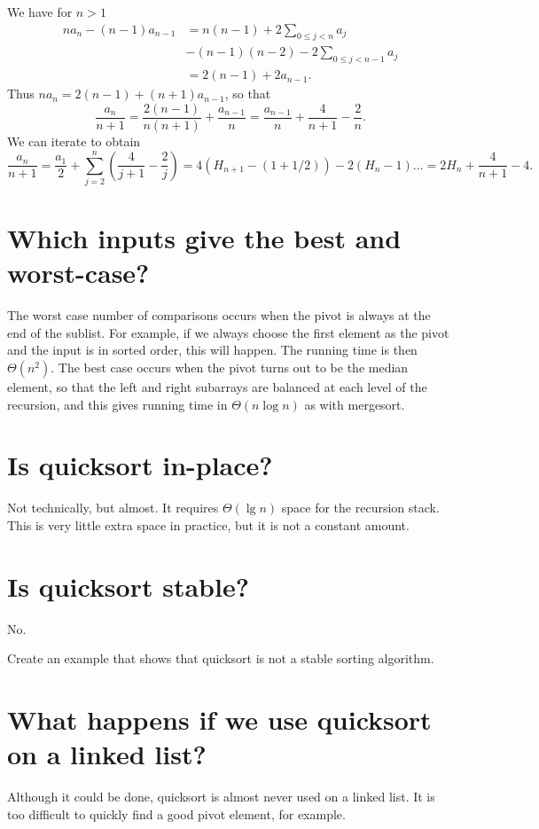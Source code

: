 We have for $n>1$
\begin{align*}
na_n - (n-1) a_{n-1} & = n(n-1) + 2 \sum_{0\leq j < n} a_j \\
& - (n-1)(n-2) - 2\sum_{0 \leq j < n - 1} a_j \\
& = 2(n - 1) + 2 a_{n-1}\text{.}
\end{align*}
Thus $na_n = 2(n - 1) + (n+1)a_{n-1}$, so that 
$$
\frac{a_n}{n+1} = \frac{2(n-1)}{n(n+1)} + \frac{a_{n-1}}{n} = 
\frac{a_{n-1}}{n} + \frac{4}{n+1} - \frac{2}{n}\text{.}
$$
We can iterate to obtain
$$\frac{a_n}{n+1} = \frac{a_1}{2} + \sum_{j=2}^n \left(\frac{4}{j+1} - 
\frac{2}{j}\right) = 4(H_{n+1} - (1+1/2)) - 2(H_n - 1)\dots = 2H_n + \frac{4}{n+1} - 4\text{.}$$

\section{Which inputs give the best and worst-case?}
The worst case number of comparisons occurs when the pivot is always at the end of the sublist. 
For example, if we always choose the first element as the pivot and the input is in sorted order, this will happen. 
The running time is then $\Theta(n^2)$. 
The best case occurs when the pivot turns out to be the median element, so that the left and right subarrays are balanced at each level of the recursion, 
and this gives running time in $\Theta(n\log n)$ as with mergesort.

\section{Is quicksort in-place?}
Not technically, but almost. It requires $\Theta(\lg n)$ space for the recursion stack. This is very little extra space in practice, but it is not a constant amount.

\section{Is quicksort stable?}
No.
\begin{Boxample}[5]
Create an example that shows that quicksort is not a stable sorting algorithm.
\end{Boxample}

\section{What happens if we  use quicksort on a linked list?}
Although it could be done, quicksort is almost never used on a linked list. It is too difficult to quickly find a good pivot element, for example.

